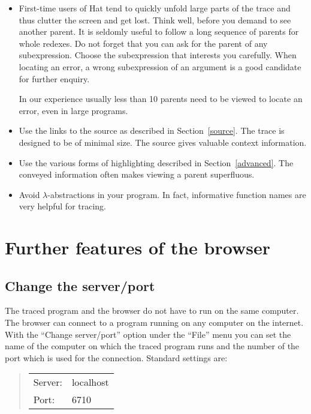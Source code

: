 \documentclass[12pt]{article}
\begin{document}
\begin{itemize}
\item First-time users of Hat tend to quickly unfold large parts of the trace and thus clutter the screen and get lost. Think well, before you demand to see another parent. It is seldomly useful to follow a long sequence of parents for whole redexes. Do not forget that you can ask for the parent of any subexpression. Choose the subexpression that interests you carefully. When locating an error, a wrong subexpression of an argument is a good candidate for further enquiry.

In our experience usually less than 10 parents need to be viewed to locate an error, even in large programs.

\item Use the links to the source as described in Section~\ref{source}. The trace is designed to be of minimal size. The source gives valuable context information.

\item Use the various forms of highlighting described in Section~\ref{advanced}. The conveyed information often makes viewing a parent superfluous.

\item Avoid $\lambda$-abstractions in your program. In fact, informative function names are very helpful for tracing.

\end{itemize}


\section{Further features of the browser}

\subsection{Change the server/port}

The traced program and the browser do not have to run on the same computer.
The browser can connect to a program running on any computer on the internet.
With the ``Change server/port'' option under the ``File'' menu you can set the name of the computer on which the traced program runs and the number of the port which is used for the connection. Standard settings are:
\begin{quote}
\begin{tabular}{ll}
Server: & localhost \\
Port: & 6710 \\
\end{tabular}
\end{quote}
\end{document}

